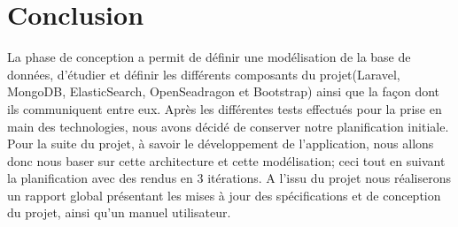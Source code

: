 \section{Conclusion}
\label{sec:conc}
	La phase de conception a permit de définir une modélisation de la base de données, d'étudier et définir les différents composants du projet(Laravel, MongoDB, ElasticSearch, OpenSeadragon et Bootstrap) ainsi que la façon dont ils communiquent entre eux. Après les différentes tests effectués pour la prise en main des technologies, nous avons décidé de conserver notre planification initiale.
	Pour la suite du projet, à savoir le développement de l'application, nous allons donc nous baser sur cette architecture et cette modélisation; ceci tout en suivant la planification avec des rendus en 3 itérations.
	A l'issu du projet nous réaliserons un rapport global présentant les mises à jour des spécifications et de conception du projet, ainsi qu'un manuel utilisateur.





